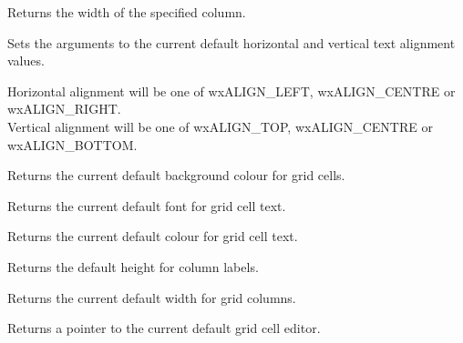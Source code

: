 
Returns the width of the specified column.

\label{wxgridgetdefaultcellalignment}


Sets the arguments to the current default horizontal and vertical text alignment
values.

Horizontal alignment will be one of wxALIGN_LEFT, wxALIGN_CENTRE or wxALIGN_RIGHT. \\
Vertical alignment will be one of wxALIGN_TOP, wxALIGN_CENTRE or wxALIGN_BOTTOM.

\label{wxgridgetdefaultcellbackgroundcolour}


Returns the current default background colour for grid cells.

\label{wxgridgetdefaultcellfont}


Returns the current default font for grid cell text.

\label{wxgridgetdefaultcelltextcolour}


Returns the current default colour for grid cell text.

\label{wxgridgetdefaultcollabelsize}


Returns the default height for column labels.

\label{wxgridgetdefaultcolsize}


Returns the current default width for grid columns.

\label{wxgridgetdefaulteditor}


Returns a pointer to the current default grid cell editor.

